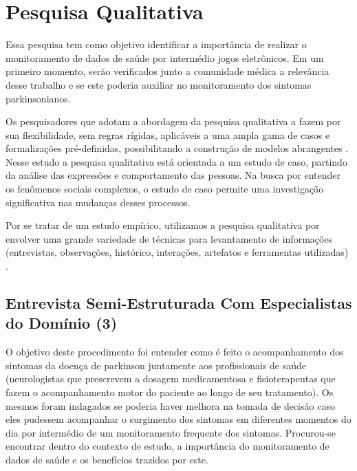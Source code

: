 \section{Pesquisa Qualitativa}
Essa pesquisa tem como objetivo identificar a importância de realizar o monitoramento de dados de saúde por intermédio jogos eletrônicos. Em um primeiro momento, serão verificados junto a comunidade médica a relevância desse trabalho e se este poderia auxiliar no monitoramento dos sintomas parkinsonianos. 

Os pesquisadores que adotam a abordagem da pesquisa qualitativa a fazem por sua flexibilidade, sem regras rígidas, aplicáveis a uma ampla gama de casos e formalizações pré-definidas, possibilitando a construção de modelos abrangentes \cite{Gom00}. 
Nesse estudo a pesquisa qualitativa está orientada a um estudo de caso, partindo da análise das expressões e comportamento das pessoas. Na busca por entender os fenômenos sociais complexos, o estudo de caso permite uma investigação significativa nas mudanças desses processos\cite{Yin05}.

Por se tratar de um estudo empírico, utilizamos a pesquisa qualitativa por envolver uma grande variedade de técnicas para levantamento de informações (entrevistas, observações, histórico, interações, artefatos e ferramentas utilizadas) \cite{FLI04}.





\subsection{Entrevista Semi-Estruturada Com Especialistas do Domínio (3)}\label{section:entrevista_semi-estruturada}

O objetivo deste procedimento foi entender como é feito o acompanhamento dos sintomas da doença de parkinson juntamente aos profissionais de saúde (neurologistas que prescrevem a dosagem medicamentosa e fisioterapeutas que fazem o acompanhamento motor do paciente ao longo de seu tratamento). Os mesmos foram indagados se poderia haver melhora na tomada de decisão caso eles pudessem acompanhar o surgimento dos sintomas em diferentes momentos do dia por intermédio de um monitoramento frequente dos sintomas. Procurou-se encontrar dentro do contexto de estudo, a importância do monitoramento de dados de saúde e os benefícios trazidos por este.

